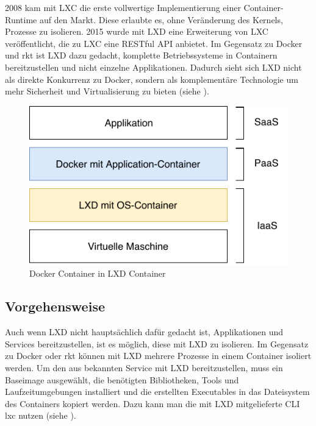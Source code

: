 2008 kam mit LXC die erste vollwertige Implementierung einer Container-Runtime auf den Markt. Diese erlaubte es, ohne Veränderung des Kernels, Prozesse zu isolieren. 2015 wurde mit LXD eine Erweiterung von LXC veröffentlicht, die zu LXC eine RESTful API anbietet. Im Gegensatz zu Docker und rkt ist LXD dazu gedacht, komplette Betriebssysteme in Containern bereitzustellen und nicht einzelne Applikationen. Dadurch sieht sich LXD nicht als direkte Konkurrenz zu Docker, sondern als komplementäre Technologie um mehr Sicherheit und Virtualisierung zu bieten \citep{TheLXDContainerHypervisor} (siehe ).

\begin{figure}[h]
	\begin{center}
		\includegraphics[]{bilder/cloud-stack.pdf}
		\caption{Docker Container in LXD Container}
		\label{fig:cloudStack}		
	\end{center}
\end{figure}

\subsection{Vorgehensweise}
\label{sec:compLXDVorgehen}

Auch wenn LXD nicht hauptsächlich dafür gedacht ist, Applikationen und Services bereitzustellen, ist es möglich, diese mit LXD zu isolieren. Im Gegensatz zu Docker oder rkt können mit LXD mehrere Prozesse in einem Container isoliert werden. Um den aus  bekannten Service mit LXD bereitzustellen, muss ein Baseimage ausgewählt, die benötigten Bibliotheken, Tools und Laufzeitumgebungen installiert und die erstellten Executables in das Dateisystem des Containers kopiert werden. Dazu kann man die mit LXD mitgelieferte CLI lxc nutzen (siehe ).

